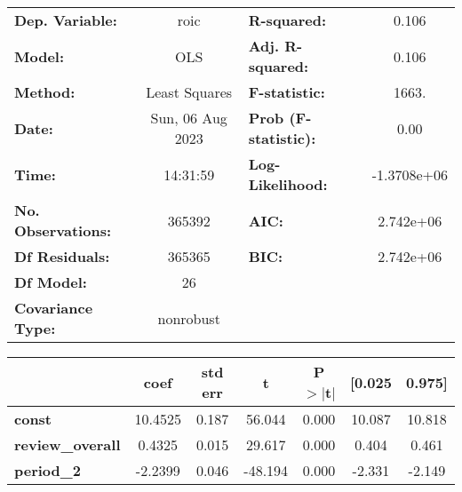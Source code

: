 \begin{center}
\begin{tabular}{lclc}
\toprule
\textbf{Dep. Variable:}                                               &       roic       & \textbf{  R-squared:         } &      0.106   \\
\textbf{Model:}                                                       &       OLS        & \textbf{  Adj. R-squared:    } &      0.106   \\
\textbf{Method:}                                                      &  Least Squares   & \textbf{  F-statistic:       } &      1663.   \\
\textbf{Date:}                                                        & Sun, 06 Aug 2023 & \textbf{  Prob (F-statistic):} &      0.00    \\
\textbf{Time:}                                                        &     14:31:59     & \textbf{  Log-Likelihood:    } & -1.3708e+06  \\
\textbf{No. Observations:}                                            &      365392      & \textbf{  AIC:               } &  2.742e+06   \\
\textbf{Df Residuals:}                                                &      365365      & \textbf{  BIC:               } &  2.742e+06   \\
\textbf{Df Model:}                                                    &          26      & \textbf{                     } &              \\
\textbf{Covariance Type:}                                             &    nonrobust     & \textbf{                     } &              \\
\bottomrule
\end{tabular}
\begin{tabular}{lcccccc}
                                                                      & \textbf{coef} & \textbf{std err} & \textbf{t} & \textbf{P$> |$t$|$} & \textbf{[0.025} & \textbf{0.975]}  \\
\midrule
\textbf{const}                                                        &      10.4525  &        0.187     &    56.044  &         0.000        &       10.087    &       10.818     \\
\textbf{review\_overall}                                              &       0.4325  &        0.015     &    29.617  &         0.000        &        0.404    &        0.461     \\
\textbf{period\_2}                                                    &      -2.2399  &        0.046     &   -48.194  &         0.000        &       -2.331    &       -2.149     \\

\end{tabular}
\end{center}
